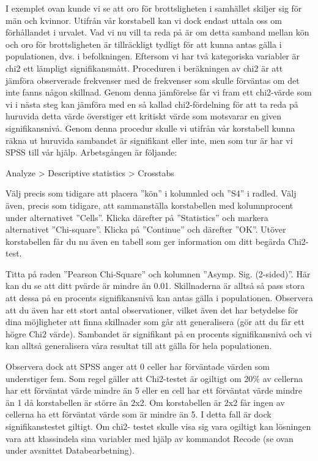 \documentclass[
]{book}
\begin{document}
I exemplet ovan kunde vi se att oro för brottsligheten i samhället skiljer sig för män och kvinnor. Utifrån
vår korstabell kan vi dock endast uttala oss om förhållandet i urvalet. Vad vi nu vill ta reda på är om detta
samband mellan kön och oro för brottsligheten är tillräckligt tydligt för att kunna antas gälla i
populationen, dvs. i befolkningen. Eftersom vi har två kategoriska variabler är chi2 ett lämpligt
signifikansmått. Proceduren i beräkningen av chi2 är att jämföra observerade frekvenser med de
frekvenser som skulle förväntas om det inte fanns någon skillnad. Genom denna jämförelse får vi fram
ett chi2-värde som vi i nästa steg kan jämföra med en så kallad chi2-fördelning för att ta reda på
huruvida detta värde överstiger ett kritiskt värde som motsvarar en given signifikansnivå. Genom denna
procedur skulle vi utifrån vår korstabell kunna räkna ut huruvida sambandet är signifikant eller inte,
men som tur är har vi SPSS till vår hjälp. Arbetsgången är följande:

Analyze \textgreater{} Descriptive statistics \textgreater{} Crosstabs

Välj precis som tidigare att placera ''kön'' i kolumnled och ''S4'' i radled. Välj även, precis som tidigare,
att sammanställa korstabellen med kolumnprocent under alternativet ''Cells''. Klicka därefter på
''Statistics'' och markera alternativet ''Chi-square''. Klicka på ''Continue'' och därefter ''OK''. Utöver korstabellen får du nu även en tabell som ger
information om ditt begärda Chi2-test.

Titta på raden ''Pearson Chi-Square'' och kolumnen ''Asymp. Sig. (2-sided)''. Här kan du se att ditt pvärde
är mindre än 0.01. Skillnaderna är alltså så pass stora att dessa på en procents signifikansnivå kan
antas gälla i populationen. Observera att du även har ett stort antal observationer, vilket även det har
betydelse för dina möjligheter att finna skillnader som går att generalisera (gör att du får ett högre Chi2
värde). Sambandet är signifikant på en procents signifikansnivå och vi kan alltså generalisera våra
resultat till att gälla för hela populationen.

Observera dock att SPSS anger att 0 celler har förväntade värden som understiger fem. Som regel gäller
att Chi2-testet är ogiltigt om 20\% av cellerna har ett förväntat värde mindre än 5 eller en cell har ett
förväntat värde mindre än 1 då korstabellen är större än 2x2. Om korstabellen är 2x2 får ingen av
cellerna ha ett förväntat värde som är mindre än 5. I detta fall är dock signifikanstestet giltigt. Om chi2-
testet skulle visa sig vara ogiltigt kan lösningen vara att klassindela sina variabler med hjälp av
kommandot Recode (se ovan under avsnittet Databearbetning).
\end{document}
